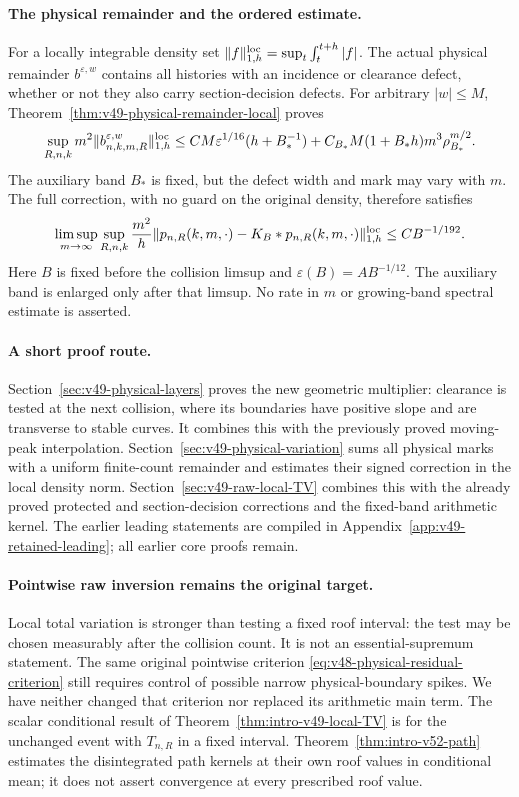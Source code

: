 \documentclass[11pt,reqno]{amsart}
\numberwithin{equation}{section}
\theoremstyle{definition}\newtheorem{definition}[theorem]{Definition}
\theoremstyle{remark}\newtheorem{remark}[theorem]{Remark}
\begin{document}
\paragraph{The physical remainder and the ordered estimate.}
For a locally integrable density set
$\|f\|_{1,h}^{\rm loc}=\sup_t\int_t^{t+h}|f|$.
The actual physical remainder $b^{\varepsilon,w}$ contains all
histories with an incidence or clearance defect, whether or not they
also carry section-decision defects. For arbitrary $|w|\le M$,
Theorem~\ref{thm:v49-physical-remainder-local} proves
\[
 \sup_{R,n,k}m^2\|b^{\varepsilon,w}_{n,k,m,R}\|_{1,h}^{\rm loc}
 \le CM\varepsilon^{1/16}(h+B_*^{-1})
       +C_{B_*}M(1+B_*h)m^3\rho_{B_*}^{m/2}.
\]
The auxiliary band $B_*$ is fixed, but the defect width and mark may
vary with $m$. The full correction, with no guard on the original
density, therefore satisfies
\[
 \limsup_{m\to\infty}\sup_{R,n,k}
 \frac{m^2}{h}\|p_{n,R}(k,m,\cdot)-K_B*p_{n,R}(k,m,\cdot)\|_{1,h}^{\rm loc}
                         \le CB^{-1/192}.
\]
Here $B$ is fixed before the collision limsup and
$\varepsilon(B)=AB^{-1/12}$. The auxiliary band is enlarged only
after that limsup. No rate in $m$ or growing-band spectral estimate
is asserted.

\paragraph{A short proof route.}
Section~\ref{sec:v49-physical-layers} proves the new geometric
multiplier: clearance is tested at the next collision, where its
boundaries have positive slope and are transverse to stable curves.
It combines this with the previously proved moving-peak interpolation.
Section~\ref{sec:v49-physical-variation} sums all physical marks
with a uniform finite-count remainder and estimates their signed
correction in the local density norm.
Section~\ref{sec:v49-raw-local-TV} combines this with the already
proved protected and section-decision corrections and the fixed-band
arithmetic kernel. The earlier leading statements are compiled in
Appendix~\ref{app:v49-retained-leading}; all earlier core proofs remain.

\paragraph{Pointwise raw inversion remains the original target.}
Local total variation is stronger than testing a fixed roof interval:
the test may be chosen measurably after the collision count. It is not
an essential-supremum statement. The same original pointwise criterion
\eqref{eq:v48-physical-residual-criterion} still requires control of
possible narrow physical-boundary spikes. We have neither changed that
criterion nor replaced its arithmetic main term. The scalar conditional result of Theorem~\ref{thm:intro-v49-local-TV}
is for the unchanged event with $T_{n,R}$ in a fixed interval.
Theorem~\ref{thm:intro-v52-path} estimates the disintegrated path
kernels at their own roof values in conditional mean; it does not
assert convergence at every prescribed roof value.
\end{document}
